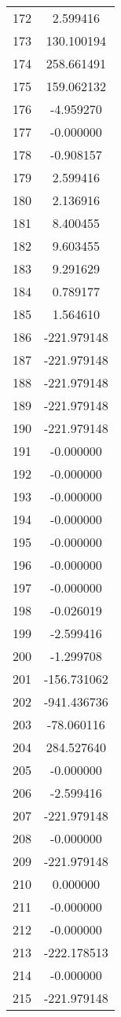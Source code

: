 \documentclass[12pt]{article}
\begin{document}
\begin{longtable}{@{}cc@{}}
172 & 2.599416 \\
173 & 130.100194 \\
174 & 258.661491 \\
175 & 159.062132 \\
176 & -4.959270 \\
177 & -0.000000 \\
178 & -0.908157 \\
179 & 2.599416 \\
180 & 2.136916 \\
181 & 8.400455 \\
182 & 9.603455 \\
183 & 9.291629 \\
184 & 0.789177 \\
185 & 1.564610 \\
186 & -221.979148 \\
187 & -221.979148 \\
188 & -221.979148 \\
189 & -221.979148 \\
190 & -221.979148 \\
191 & -0.000000 \\
192 & -0.000000 \\
193 & -0.000000 \\
194 & -0.000000 \\
195 & -0.000000 \\
196 & -0.000000 \\
197 & -0.000000 \\
198 & -0.026019 \\
199 & -2.599416 \\
200 & -1.299708 \\
201 & -156.731062 \\
202 & -941.436736 \\
203 & -78.060116 \\
204 & 284.527640 \\
205 & -0.000000 \\
206 & -2.599416 \\
207 & -221.979148 \\
208 & -0.000000 \\
209 & -221.979148 \\
210 & 0.000000 \\
211 & -0.000000 \\
212 & -0.000000 \\
213 & -222.178513 \\
214 & -0.000000 \\
215 & -221.979148 \\

\end{longtable}
\end{document}
